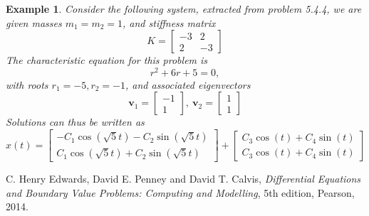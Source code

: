 \documentclass[11pt]{amsart}
\newtheorem{example}{Example}
\numberwithin{equation}{section}
\begin{document}
\begin{example}
Consider the following system, extracted from problem 5.4.4, we are given masses $m_1=m_2=1$, and stiffness matrix
\begin{equation*}
K =
\begin{bmatrix}
-3 & 2 \\
2 & -3
\end{bmatrix}
\end{equation*}
The characteristic equation for this problem is 
\begin{equation*}
r^2+6r+5= 0,
\end{equation*}
with roots $r_1=-5, r_2=-1$, and associated eigenvectors
\begin{equation*}
\mathbf{v}_1 = 
\begin{bmatrix}
-1\\
1
\end{bmatrix}, \ \mathbf{v}_2 =
\begin{bmatrix}
1\\
1
\end{bmatrix}
\end{equation*}
Solutions can thus be written as
\begin{equation*}
x(t) =\begin{bmatrix}
-C_1\cos(\sqrt{5}t) - C_2 \sin(\sqrt{5}t) \\
C_1\cos(\sqrt{5}t)+C_2\sin(\sqrt{5}t)
\end{bmatrix} + 
\begin{bmatrix}
C_3\cos(t) + C_4\sin(t) \\
C_3\cos(t) + C_4\sin(t) 
\end{bmatrix}
\end{equation*}
\end{example}

\begin{thebibliography}{0}

 C. Henry Edwards, David E. Penney and David T. Calvis, {\it Differential Equations and Boundary Value Problems: Computing and Modelling}, 5th edition, Pearson, 2014.

\end{thebibliography}
\end{document}

